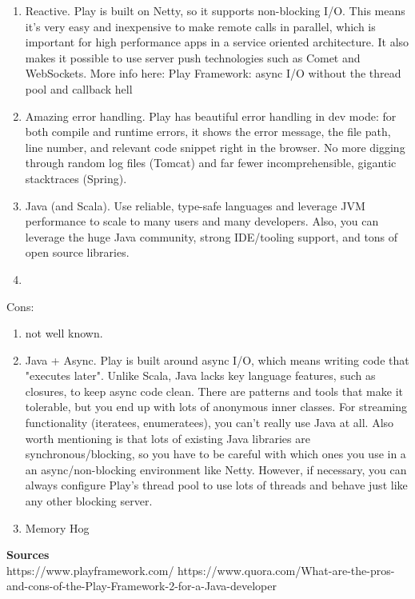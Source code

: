 \begin{enumerate}
	\item Reactive. Play is built on Netty, so it supports non-blocking I/O. This means it's very easy and inexpensive to make remote calls in parallel, which is important for high performance apps in a service oriented architecture. It also makes it possible to use server push technologies such as Comet and WebSockets. More info here: Play Framework: async I/O without the thread pool and callback hell 
	\item Amazing error handling. Play has beautiful error handling in dev mode: for both compile and runtime errors, it shows the error message, the file path, line number, and relevant code snippet right in the browser. No more digging through random log files (Tomcat) and far fewer incomprehensible, gigantic stacktraces (Spring).
	\item Java (and Scala). Use reliable, type-safe languages and leverage JVM performance to scale to many users and many developers. Also, you can leverage the huge Java community, strong IDE/tooling support, and tons of open source libraries.
	\item 
\end{enumerate}
Cons:
\begin{enumerate}
	\item not well known.
	\item Java + Async. Play is built around async I/O, which means writing code that "executes later". Unlike Scala, Java lacks key language features, such as closures, to keep async code clean. There are patterns and tools that make it tolerable, but you end up with lots of anonymous inner classes. For streaming functionality (iteratees, enumeratees), you can't really use Java at all. Also worth mentioning is that lots of existing Java libraries are synchronous/blocking, so you have to be careful with which ones you use in a an async/non-blocking environment like Netty. However, if necessary, you can always configure Play's thread pool to use lots of threads and behave just like any other blocking server.
	\item Memory Hog
\end{enumerate}

\textbf{Sources} \\
https://www.playframework.com/
https://www.quora.com/What-are-the-pros-and-cons-of-the-Play-Framework-2-for-a-Java-developer